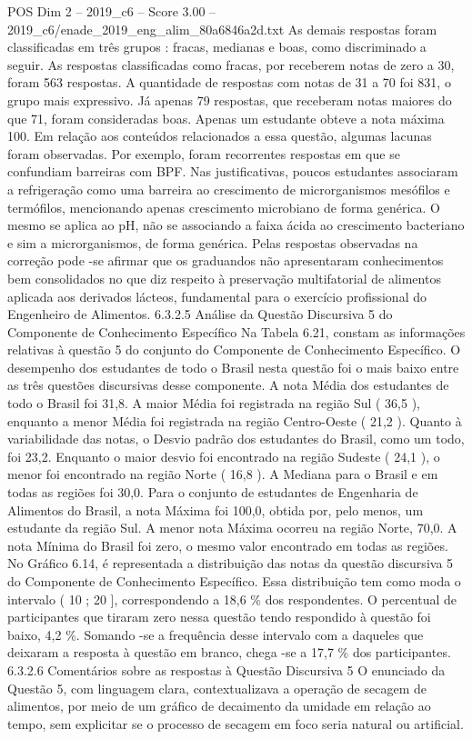 \begin{textsample}{POS Dim 2 – 2019\_c6 – Score 3.00 – 2019\_c6/enade\_2019\_eng\_alim\_80a6846a2d.txt}
As demais respostas foram classificadas em três grupos : fracas, medianas e boas, como discriminado a seguir.
As respostas classificadas como fracas, por receberem notas de zero a 30, foram 563 respostas.
A quantidade de respostas com notas de 31 a 70 foi 831, o grupo mais expressivo.
Já apenas 79 respostas, que receberam notas maiores do que 71, foram consideradas boas.
Apenas um estudante obteve a nota máxima 100.
Em relação aos conteúdos relacionados a essa questão, algumas lacunas foram observadas.
Por exemplo, foram recorrentes respostas em que se confundiam barreiras com BPF.
Nas justificativas, poucos estudantes associaram a refrigeração como uma barreira ao crescimento de microrganismos mesófilos e termófilos, mencionando apenas crescimento microbiano de forma genérica.
O mesmo se aplica ao pH, não se associando a faixa ácida ao crescimento bacteriano e sim a microrganismos, de forma genérica.
Pelas respostas observadas na correção pode -se afirmar que os graduandos não apresentaram conhecimentos bem consolidados no que diz respeito à preservação multifatorial de alimentos aplicada aos derivados lácteos, fundamental para o exercício profissional do Engenheiro de Alimentos. 6.3.2.5 Análise da Questão Discursiva 5 do Componente de Conhecimento Específico Na Tabela 6.21, constam as informações relativas à questão 5 do conjunto do Componente de Conhecimento Específico.
O desempenho dos estudantes de todo o Brasil nesta questão foi o mais baixo entre as três questões discursivas desse componente.
A nota Média dos estudantes de todo o Brasil foi 31,8.
A maior Média foi registrada na região Sul ( 36,5 ), enquanto a menor Média foi registrada na região Centro-Oeste ( 21,2 ).
Quanto à variabilidade das notas, o Desvio padrão dos estudantes do Brasil, como um todo, foi 23,2.
Enquanto o maior desvio foi encontrado na região Sudeste ( 24,1 ), o menor foi encontrado na região Norte ( 16,8 ).
A Mediana para o Brasil e em todas as regiões foi 30,0.
Para o conjunto de estudantes de Engenharia de Alimentos do Brasil, a nota Máxima foi 100,0, obtida por, pelo menos, um estudante da região Sul.
A menor nota Máxima ocorreu na região Norte, 70,0.
A nota Mínima do Brasil foi zero, o mesmo valor encontrado em todas as regiões.
No Gráfico 6.14, é representada a distribuição das notas da questão discursiva 5 do Componente de Conhecimento Específico.
Essa distribuição tem como moda o intervalo ( 10 ; 20 ], correspondendo a 18,6 \% dos respondentes.
O percentual de participantes que tiraram zero nessa questão tendo respondido à questão foi baixo, 4,2 \%.
Somando -se a frequência desse intervalo com a daqueles que deixaram a resposta à questão em branco, chega -se a 17,7 \% dos participantes. 6.3.2.6 Comentários sobre as respostas à Questão Discursiva 5 O enunciado da Questão 5, com linguagem clara, contextualizava a operação de secagem de alimentos, por meio de um gráfico de decaimento da umidade em relação ao tempo, sem explicitar se o processo de secagem em foco seria natural ou artificial.

\end{textsample}
